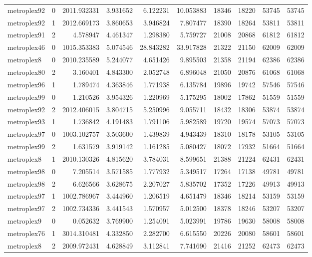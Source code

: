 \begin{longtable}{|l|r|r|r|r|r|r|r|r|r|}
metroplex92 & 0 & 2011.932331 & 3.931652 & 6.122231 & 10.053883 & 18346 & 18220 & 53745 & 53745 \\
metroplex92 & 1 & 2012.669173 & 3.860653 & 3.946824 & 7.807477 & 18390 & 18264 & 53811 & 53811 \\
metroplex91 & 2 & 4.578947 & 4.461347 & 1.298380 & 5.759727 & 21008 & 20868 & 61812 & 61812 \\
metroplex46 & 0 & 1015.353383 & 5.074546 & 28.843282 & 33.917828 & 21322 & 21150 & 62009 & 62009 \\
metroplex8 & 0 & 2010.235589 & 5.244077 & 4.651426 & 9.895503 & 21358 & 21194 & 62386 & 62386 \\
metroplex80 & 2 & 3.160401 & 4.843300 & 2.052748 & 6.896048 & 21050 & 20876 & 61068 & 61068 \\
metroplex96 & 1 & 1.789474 & 4.363846 & 1.771938 & 6.135784 & 19896 & 19742 & 57546 & 57546 \\
metroplex99 & 0 & 1.210526 & 3.954326 & 1.220969 & 5.175295 & 18002 & 17862 & 51559 & 51559 \\
metroplex92 & 2 & 2012.406015 & 3.804715 & 5.250996 & 9.055711 & 18432 & 18306 & 53874 & 53874 \\
metroplex93 & 1 & 1.736842 & 4.191483 & 1.791106 & 5.982589 & 19720 & 19574 & 57073 & 57073 \\
metroplex97 & 0 & 1003.102757 & 3.503600 & 1.439839 & 4.943439 & 18310 & 18178 & 53105 & 53105 \\
metroplex99 & 2 & 1.631579 & 3.919142 & 1.161285 & 5.080427 & 18072 & 17932 & 51664 & 51664 \\
metroplex8 & 1 & 2010.130326 & 4.815620 & 3.784031 & 8.599651 & 21388 & 21224 & 62431 & 62431 \\
metroplex98 & 0 & 7.205514 & 3.571585 & 1.777932 & 5.349517 & 17264 & 17138 & 49781 & 49781 \\
metroplex98 & 2 & 6.626566 & 3.628675 & 2.207027 & 5.835702 & 17352 & 17226 & 49913 & 49913 \\
metroplex97 & 1 & 1002.786967 & 3.444960 & 1.206519 & 4.651479 & 18346 & 18214 & 53159 & 53159 \\
metroplex97 & 2 & 1002.734336 & 3.441543 & 1.570957 & 5.012500 & 18378 & 18246 & 53207 & 53207 \\
metroplex9 & 0 & 0.052632 & 3.769900 & 1.254091 & 5.023991 & 19786 & 19630 & 58008 & 58008 \\
metroplex76 & 1 & 3014.310481 & 4.332850 & 2.282700 & 6.615550 & 20226 & 20080 & 58601 & 58601 \\
metroplex8 & 2 & 2009.972431 & 4.628849 & 3.112841 & 7.741690 & 21416 & 21252 & 62473 & 62473 \\

\end{longtable}

